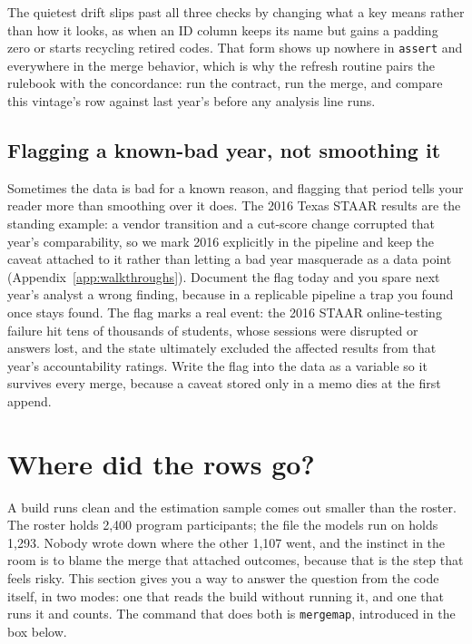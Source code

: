 The quietest drift slips past all three checks by changing what a key means rather than how it looks, as when an ID column keeps its name but gains a padding zero or starts recycling retired codes. That form shows up nowhere in \texttt{assert} and everywhere in the merge behavior, which is why the refresh routine pairs the rulebook with the concordance: run the contract, run the merge, and compare this vintage's row against last year's before any analysis line runs.

\subsection{Flagging a known-bad year, not smoothing it}\label{sec:ch06-pollutedyear}
Sometimes the data is bad for a known reason, and flagging that period tells your reader more than smoothing over it does. The 2016 Texas STAAR results are the standing example: a vendor transition and a cut-score change corrupted that year's comparability, so we mark 2016 explicitly in the pipeline and keep the caveat attached to it rather than letting a bad year masquerade as a data point (Appendix~\ref{app:walkthroughs}). Document the flag today and you spare next year's analyst a wrong finding, because in a replicable pipeline a trap you found once stays found. The flag marks a real event: the 2016 STAAR online-testing failure hit tens of thousands of students, whose sessions were disrupted or answers lost, and the state ultimately excluded the affected results from that year's accountability ratings. Write the flag into the data as a variable so it survives every merge, because a caveat stored only in a memo dies at the first append.

\section{Where did the rows go?}\label{sec:ch06-mergemap}
A build runs clean and the estimation sample comes out smaller than the roster. The roster holds 2,400 program participants; the file the models run on holds 1,293. Nobody wrote down where the other 1,107 went, and the instinct in the room is to blame the merge that attached outcomes, because that is the step that feels risky. This section gives you a way to answer the question from the code itself, in two modes: one that reads the build without running it, and one that runs it and counts. The command that does both is \texttt{mergemap}, introduced in the box below.

